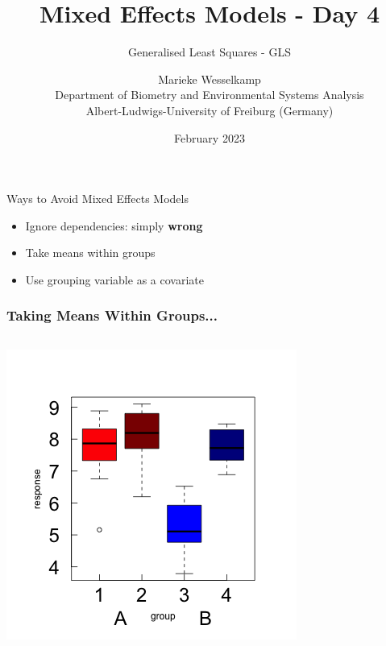 \documentclass{beamer}
\title{Mixed Effects Models - Day 4}
\subtitle{Generalised Least Squares - GLS}
\author{Marieke Wesselkamp\\Department of Biometry and Environmental Systems Analysis\\Albert-Ludwigs-University of Freiburg (Germany)}
\date{February 2023}
\newenvironment{VerbatimIN}
 {\VerbatimEnvironment
  \begin{tcolorbox}[
    breakable,
    colback=lightgray,
    spartan
  ]%
  \begin{Verbatim}}
 {\end{Verbatim}\end{tcolorbox}}
\begin{document}
\begin{frame}
  \titlepage
\end{frame}

\begin{frame}{Ways to Avoid Mixed Effects Models}
  \begin{itemize}
    \Large 
    \item Ignore dependencies: simply \textbf{wrong}
    \item Take means within groups
    \item Use grouping variable as a covariate
  \end{itemize}
\end{frame}

\begin{frame}[fragile]
\frametitle{Taking Means Within Groups...}
\begin{columns}
    \begin{column}{0.45\textwidth}
        \includegraphics[width=\textwidth]{lectures/day_4_GLS/figures/unnamed-chunk-3-1.png}
    \end{column}
\end{columns}
\end{frame}
\end{document}
